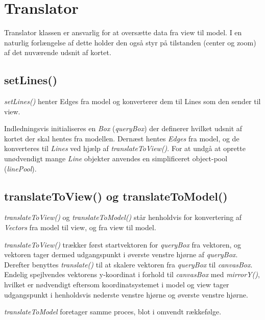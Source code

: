 \section{Translator}

Translator klassen er ansvarlig for at oversætte data fra view til model. I en naturlig forlængelse af dette holder den også styr på tilstanden (center og zoom) af det nuværende udsnit af kortet.

\subsection{setLines()}

\emph{setLines()} henter Edges fra model og konverterer dem til Lines som den sender til view.

Indledningsvis initialiseres en \emph{Box} (\emph{queryBox}) der definerer hvilket udsnit af kortet der skal hentes fra modellen. Dernæst hentes \emph{Edges} fra model, og de konverteres til \emph{Lines} ved hjælp af \emph{translateToView()}. For at undgå at oprette unødvendigt mange \emph{Line} objekter anvendes en simplificeret object-pool (\emph{linePool}).

\subsection{translateToView() og translateToModel()}

\emph{translateToView()} og \emph{translateToModel()} står henholdvis for konvertering af \emph{Vectors} fra model til view, og fra view til model.

\emph{translateToView()} trækker først startvektoren for \emph{queryBox} fra vektoren, og vektoren tager dermed udgangspunkt i øverste venstre hjørne af \emph{queryBox}. Derefter benyttes \emph{translate()} til at skalere vektoren fra \emph{queryBox} til \emph{canvasBox}. Endelig spejlvendes vektorens y-koordinat i forhold til \emph{canvasBox} med \emph{mirrorY()}, hvilket er nødvendigt eftersom koordinatsystemet i model og view tager udgangspunkt i henholdsvis nederste venstre hjørne og øverste venstre hjørne.

\emph{translateToModel} foretager samme proces, blot i omvendt rækkefølge.